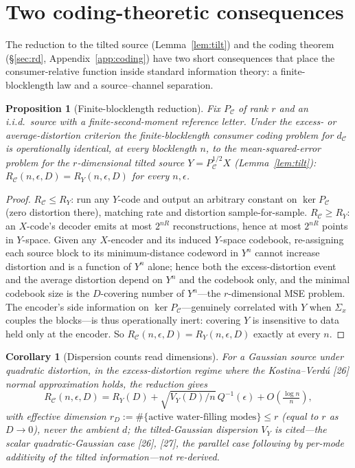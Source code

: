 \documentclass[lettersize,onecolumn]{IEEEtran}
\newtheorem{proposition}{Proposition}
\newtheorem{corollary}{Corollary}
\theoremstyle{definition}
\theoremstyle{remark}
\newcommand{\PC}{P_{\mathcal{C}}}
\begin{document}
\section{Two coding-theoretic consequences}\label{sec:consequences}

The reduction to the tilted source (Lemma~\ref{lem:tilt}) and the coding theorem
(\S\ref{sec:rd}, Appendix~\ref{app:coding}) have two short consequences that place the
consumer-relative function inside standard information theory: a finite-blocklength law
and a source--channel separation.

\begin{proposition}[Finite-blocklength reduction]\label{prop:dispersion}
Fix $\PC$ of rank $r$ and an i.i.d.\ source with a finite-second-moment reference letter.
Under the excess- or average-distortion criterion the finite-blocklength consumer coding
problem for $d_{\mathcal C}$ is operationally identical, \emph{at every blocklength $n$}, to
the mean-squared-error problem for the $r$-dimensional tilted source $Y=\PC^{1/2}X$
(Lemma~\ref{lem:tilt}): $R_{\mathcal C}(n,\epsilon,D)=R_Y(n,\epsilon,D)$ for every
$n,\epsilon$.
\end{proposition}
\begin{proof}
$R_{\mathcal C}\le R_Y$: run any $Y$-code and output an arbitrary constant on $\ker\PC$
(zero distortion there), matching rate and distortion sample-for-sample. $R_{\mathcal
C}\ge R_Y$: an $X$-code's decoder emits at most $2^{nR}$ reconstructions, hence at most
$2^{nR}$ points in $Y$-space. Given any $X$-encoder and its induced $Y$-space codebook,
re-assigning each source block to its minimum-distance codeword in $Y^n$ cannot increase
distortion and is a function of $Y^n$ alone; hence both the excess-distortion event and the
average distortion depend on $Y^n$ and the codebook only, and the minimal codebook size is
the $D$-covering number of $Y^n$---the $r$-dimensional MSE problem. The encoder's side
information on $\ker\PC$---genuinely correlated with $Y$ when $\Sigma_x$ couples the
blocks---is thus operationally inert: covering $Y$ is insensitive to data held only at the
encoder. So $R_{\mathcal C}(n,\epsilon,D)=R_Y(n,\epsilon,D)$ exactly at every $n$.
\end{proof}

\begin{corollary}[Dispersion counts read dimensions]\label{cor:dispersion}
For a Gaussian source under quadratic distortion, in the excess-distortion regime where the
Kostina--Verd\'u [26] normal approximation holds, the reduction gives
\[
R_{\mathcal C}(n,\epsilon,D)=R_Y(D)+\sqrt{V_Y(D)/n}\,Q^{-1}(\epsilon)+O\!\left(\tfrac{\log n}{n}\right),
\]
with effective dimension $r_D:=\#\{\text{active water-filling modes}\}\le r$ (equal to $r$
as $D\to0$), never the ambient $d$; the tilted-Gaussian dispersion $V_Y$ is cited---the
scalar quadratic-Gaussian case [26], [27], the parallel case
following by per-mode additivity of the tilted information---not re-derived.
\end{corollary}
\end{document}
